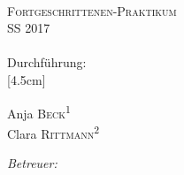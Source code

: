 \begin{titlepage}
	\par
	\par
\begin{center}
\ \\
[5.5cm]	
	\textsc{\Huge Fortgeschrittenen-Praktikum} \\
[0.5cm]
	{\Huge SS 2017} \\
[1.5cm]
	\Huge\textbf{\Versuch} \\
[1cm]
	{\large Durchführung: \Tag} \\
[4.5cm]
\begin{minipage}{0.4\textwidth}
	\begin{flushleft} \large
		Anja \textsc{Beck}\textsuperscript{1} \\
		Clara \textsc{Rittmann}\textsuperscript{2}
	\end{flushleft}
\end{minipage}
\hfill
\begin{minipage}{0.4\textwidth}
	\begin{flushright} \large
		\emph{Betreuer:} \\
		\Betreuer
	\end{flushright}
\end{minipage}
\end{center}
\end{titlepage}